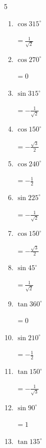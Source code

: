 \begin{multicols}{5}
\begin{enumerate}
        $\displaystyle =1$

  \item $\displaystyle \cos{315^\circ}$

        $\displaystyle =\frac{1}{\sqrt{2}}$

  \item $\displaystyle \cos{270^\circ}$

        $\displaystyle =0$

  \item $\displaystyle \sin{315^\circ}$

        $\displaystyle =-\frac{1}{\sqrt{2}}$

  \item $\displaystyle \cos{150^\circ}$

        $\displaystyle =-\frac{\sqrt{3}}{2}$

  \item $\displaystyle \cos{240^\circ}$

        $\displaystyle =-\frac{1}{2}$

  \item $\displaystyle \sin{225^\circ}$

        $\displaystyle =-\frac{1}{\sqrt{2}}$

  \item $\displaystyle \cos{150^\circ}$

        $\displaystyle =-\frac{\sqrt{3}}{2}$

  \item $\displaystyle \sin{45^\circ}$

        $\displaystyle =\frac{1}{\sqrt{2}}$

  \item $\displaystyle \tan{360^\circ}$

        $\displaystyle =0$

  \item $\displaystyle \sin{210^\circ}$

        $\displaystyle =-\frac{1}{2}$

  \item $\displaystyle \tan{150^\circ}$

        $\displaystyle =-\frac{1}{\sqrt{3}}$

  \item $\displaystyle \sin{90^\circ}$

        $\displaystyle =1$

  \item $\displaystyle \tan{135^\circ}$


\end{enumerate}
\end{multicols}
